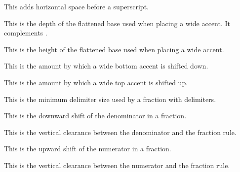 This adds horizontal space before a superscript.

\stopnewprimitive

\startnewprimitive[title={\prm {Umathflattenedaccentbasedepth}}]

This is the depth of the flattened base used when placing a wide accent. It
complements .

\stopnewprimitive

\startnewprimitive[title={\prm {Umathflattenedaccentbaseheight}}]

This is the height of the flattened base used when placing a wide accent.

\stopnewprimitive

\startnewprimitive[title={\prm {Umathflattenedaccentbottomshiftdown}}]

This is the amount by which a wide bottom accent is shifted down.

\stopnewprimitive

\startnewprimitive[title={\prm {Umathflattenedaccenttopshiftup}}]

This is the amount by which a wide top accent is shifted up.

\stopnewprimitive

\startnewprimitive[title={\prm {Umathfractiondelsize}}]

This is the minimum delimiter size used by a fraction with delimiters.

\stopnewprimitive

\startnewprimitive[title={\prm {Umathfractiondenomdown}}]

This is the downward shift of the denominator in a fraction.

\stopnewprimitive

\startnewprimitive[title={\prm {Umathfractiondenomvgap}}]

This is the vertical clearance between the denominator and the fraction rule.

\stopnewprimitive

\startnewprimitive[title={\prm {Umathfractionnumup}}]

This is the upward shift of the numerator in a fraction.

\stopnewprimitive

\startnewprimitive[title={\prm {Umathfractionnumvgap}}]

This is the vertical clearance between the numerator and the fraction rule.

\stopnewprimitive

